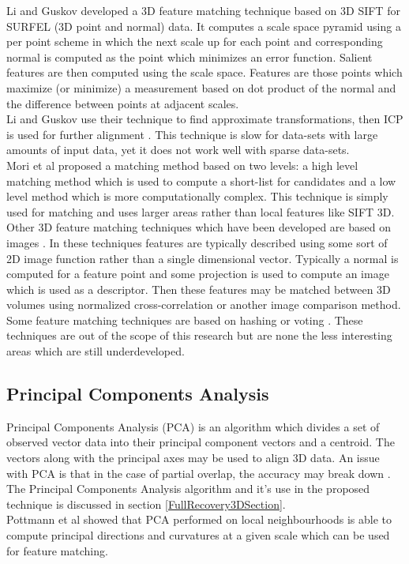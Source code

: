 Li and Guskov \cite{Li05Multiscale} developed a 3D feature matching technique based on 3D SIFT for SURFEL (3D point and normal) data. It computes a scale space pyramid using a per point scheme in which the next scale up for each point and corresponding normal is computed as the point which minimizes an error function. Salient features are then computed using the scale space. Features are those points which maximize (or minimize) a measurement based on dot product of the normal and the difference between points at adjacent scales. \\

Li and Guskov use their technique to find approximate transformations, then ICP is used for further alignment \cite{Besl92Method,Chen92Object}. This technique is slow for data-sets with large amounts of input data, yet it does not work well with sparse data-sets. \\

	
Mori et al \cite{Mori05Efficient} proposed a matching method based on two levels: a high level matching method which is used to compute a short-list for candidates and a low level method which is more computationally complex. This technique is simply used for matching and uses larger areas rather than local features like SIFT 3D. \\

Other 3D feature matching techniques which have been developed are based on images \cite{Wolfson97Geometric,Johnson97Spin}. In these techniques features are typically described using some sort of 2D image function rather than a single dimensional vector. Typically a normal is computed for a feature point and some projection is used to compute an image which is used as a descriptor. Then these features may be matched between 3D volumes using normalized cross-correlation or another image comparison method.  \\

Some feature matching techniques are based on hashing or voting \cite{Germain97Fingerprint,Gal06Salient,Mitra04Registration,Ballard91Generalizing}. These techniques are out of the scope of this research but are none the less interesting areas which are still underdeveloped.


\subsection{Principal Components Analysis}

Principal Components Analysis (PCA) is an algorithm which divides a set of observed vector data into their principal component vectors and a centroid. The vectors along with the principal axes may be used to align 3D data. An issue with PCA is that in the case of partial overlap, the accuracy may break down \cite{Aiger084}. The Principal Components Analysis algorithm and it's use in the proposed technique is discussed in section \ref{FullRecovery3DSection}. \\

Pottmann et al \cite{Pottmann07Principal} showed that PCA performed on local neighbourhoods is able to compute principal directions and curvatures at a given scale which can be used for feature matching. \\






